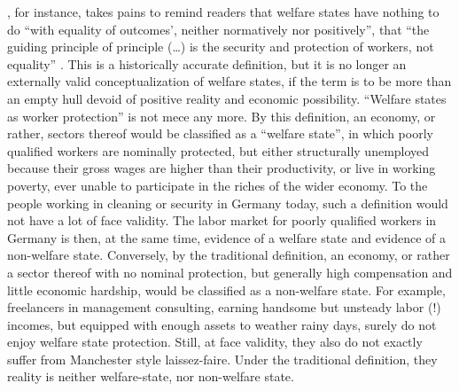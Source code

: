 \begin{enumerate}
	\citeauthor{Offe2003}, for instance, takes pains to remind readers that welfare states have nothing to do ``with equality of outcomes', neither normatively nor positively'', that ``the guiding principle of principle (\ldots) is the security and protection of workers, not equality'' \citeyearpar[450]{Offe2003}.
	This is a historically accurate definition, but it is no longer an externally valid conceptualization of welfare states, if the term is to be more than an empty hull devoid of positive reality and economic possibility.
	``Welfare states as worker protection'' is not \gls{mece} any more.
	By this definition, an economy, or rather, sectors thereof would be classified as a ``welfare state'', in which poorly qualified workers are nominally protected, but either structurally unemployed because their gross wages are higher than their productivity, or live in working poverty, ever unable to participate in the riches of the wider economy.
	To the people working in cleaning or security in Germany today, such a definition would not have a lot of face validity.
	The labor market for poorly qualified workers in Germany is then, at the same time, evidence of a welfare state and evidence of a non-welfare state.
	Conversely, by the traditional definition, an economy, or rather a sector thereof with no nominal protection, but generally high compensation and little economic hardship, would be classified as a non-welfare state.
	For example, freelancers in management consulting, earning handsome but unsteady labor (!) incomes, but equipped with enough assets to weather rainy days, surely do not enjoy welfare state protection.
	Still, at face validity, they also do not exactly suffer from Manchester style laissez-faire.
	Under the traditional definition, they reality is neither welfare-state, nor non-welfare state.


\end{enumerate}
